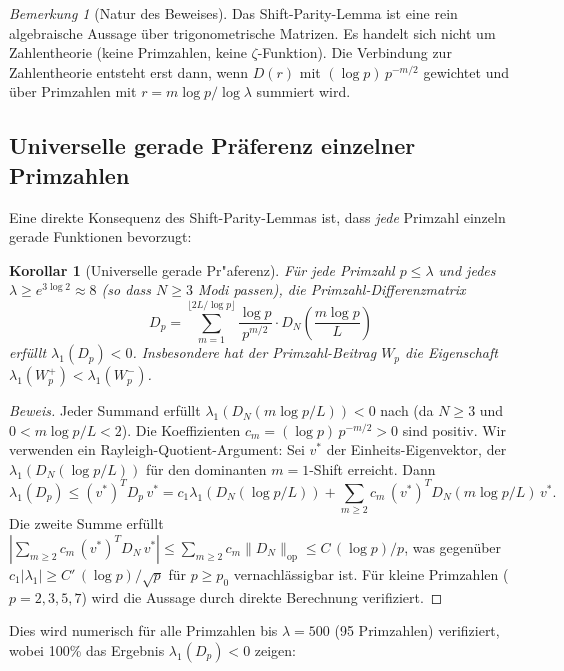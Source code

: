 \documentclass[12pt,a4paper]{article}
\newtheorem{corollary}[theorem]{Korollar}
\theoremstyle{definition}
\theoremstyle{remark}
\newtheorem{remark}[theorem]{Bemerkung}
\begin{document}
\begin{remark}[Natur des Beweises]
Das Shift-Parity-Lemma ist eine rein algebraische Aussage über trigonometrische Matrizen. Es handelt sich nicht um Zahlentheorie (keine Primzahlen, keine $\zeta$-Funktion). Die Verbindung zur Zahlentheorie entsteht erst dann, wenn $D(r)$ mit $(\log p)\,p^{-m/2}$ gewichtet und über Primzahlen mit $r = m\log p / \log\lambda$ summiert wird.
\end{remark}

\subsection{Universelle gerade Pr\"aferenz einzelner Primzahlen}

Eine direkte Konsequenz des Shift-Parity-Lemmas ist, dass \emph{jede} Primzahl einzeln gerade Funktionen bevorzugt:

\begin{corollary}[Universelle gerade Pr"aferenz]
\label{cor:universal}
Für jede Primzahl $p \leq \lambda$ und jedes $\lambda \geq e^{3\log 2} \approx 8$ (so dass $N \geq 3$ Modi passen), die Primzahl-Differenzmatrix
\[
  D_p = \sum_{m=1}^{\lfloor 2L/\log p \rfloor} \frac{\log p}{p^{m/2}} \cdot D_N\!\left(\frac{m\log p}{L}\right)
\]
erfüllt $\lambda_1(D_p) < 0$. Insbesondere hat der Primzahl-Beitrag $W_p$ die Eigenschaft $\lambda_1(W_p^+) < \lambda_1(W_p^-)$.
\end{corollary}

\begin{proof}[Beweis]
Jeder Summand erfüllt $\lambda_1(D_N(m\log p/L)) < 0$ nach  (da $N \geq 3$ und $0 < m\log p/L < 2$). Die Koeffizienten $c_m = (\log p)\,p^{-m/2} > 0$ sind positiv. Wir verwenden ein Rayleigh-Quotient-Argument: Sei $v^*$ der Einheits-Eigenvektor, der $\lambda_1(D_N(\log p/L))$ für den dominanten $m = 1$-Shift erreicht. Dann
\[
  \lambda_1(D_p) \leq (v^*)^T D_p\, v^* = c_1 \lambda_1(D_N(\log p/L)) + \sum_{m \geq 2} c_m\, (v^*)^T D_N(m\log p/L)\, v^*.
\]
Die zweite Summe erfüllt $|\sum_{m \geq 2} c_m\, (v^*)^T D_N\, v^*| \leq \sum_{m \geq 2} c_m \|D_N\|_{\mathrm{op}} \leq C\,(\log p)/p$, was gegenüber $c_1 |\lambda_1| \geq C'\,(\log p)/\sqrt{p}$ für $p \geq p_0$ vernachlässigbar ist. Für kleine Primzahlen ($p = 2, 3, 5, 7$) wird die Aussage durch direkte Berechnung verifiziert.
\end{proof}

Dies wird numerisch für alle Primzahlen bis $\lambda = 500$ (95 Primzahlen) verifiziert, wobei 100\% das Ergebnis $\lambda_1(D_p) < 0$ zeigen:
\end{document}
